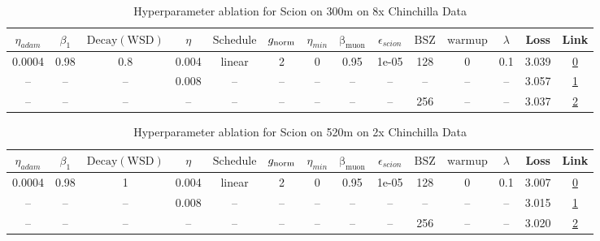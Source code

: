 \begin{table}[H]
\centering
\caption{Hyperparameter ablation for Scion on 300m on 8x Chinchilla Data}
\label{tab:ablation_scion_300m_on_8x_chinchilla_data}
\begin{tabular}{cccccccccccccc}
\toprule
$\eta_{adam}$ & $\beta_1$ & $\mathrm{Decay (WSD)}$ & $\eta$ & $\mathrm{Schedule}$ & $g_{\mathrm{norm}}$ & $\eta_{min}$ & $\mathrm{\beta_{muon}}$ & $\epsilon_{scion}$ & $\mathrm{BSZ}$ & $\mathrm{warmup}$ & $\lambda$ & Loss & Link \\
\midrule
0.0004 & 0.98 & 0.8 & 0.004 & linear & 2 & 0 & 0.95 & 1e-05 & 128 & 0 & 0.1 & 3.039 & \href{https://wandb.ai/marin-community/optimizer-scaling/runs/sweep-300m-48B-scion0ebd9blr0.004-wd0.1-minlr0-warmup0-b10.98-gn-c7b0e6}{0} \\
\midrule
-- & -- & -- & 0.008 & -- & -- & -- & -- & -- & -- & -- & -- & 3.057 & \href{https://wandb.ai/marin-community/optimizer-scaling/runs/sweep-300m-48B-scion60ecb7lr0.008-wd0.1-minlr0-warmup0-b10.98-gn-da458a}{1} \\
-- & -- & -- & -- & -- & -- & -- & -- & -- & 256 & -- & -- & 3.037 & \href{https://wandb.ai/marin-community/optimizer-scaling/runs/sweep-300m-48B-scione51587lr0.004-wd0.1-minlr0-warmup0-b10.98-gn-55b3ad}{2} \\
\bottomrule
\end{tabular}
\end{table}

\begin{table}[H]
\centering
\caption{Hyperparameter ablation for Scion on 520m on 2x Chinchilla Data}
\label{tab:ablation_scion_520m_on_2x_chinchilla_data}
\begin{tabular}{cccccccccccccc}
\toprule
$\eta_{adam}$ & $\beta_1$ & $\mathrm{Decay (WSD)}$ & $\eta$ & $\mathrm{Schedule}$ & $g_{\mathrm{norm}}$ & $\eta_{min}$ & $\mathrm{\beta_{muon}}$ & $\epsilon_{scion}$ & $\mathrm{BSZ}$ & $\mathrm{warmup}$ & $\lambda$ & Loss & Link \\
\midrule
0.0004 & 0.98 & 1 & 0.004 & linear & 2 & 0 & 0.95 & 1e-05 & 128 & 0 & 0.1 & 3.007 & \href{https://wandb.ai/marin-community/optimizer-scaling/runs/sweep-520m-21B-scioni268e92lr0.004-wd0.1-minlr0-warmup0-b10.98-g-a22c53}{0} \\
\midrule
-- & -- & -- & 0.008 & -- & -- & -- & -- & -- & -- & -- & -- & 3.015 & \href{https://wandb.ai/marin-community/optimizer-scaling/runs/sweep-520m-21B-scioni941d43lr0.008-wd0.1-minlr0-warmup0-b10.98-g-7f3250}{1} \\
-- & -- & -- & -- & -- & -- & -- & -- & -- & 256 & -- & -- & 3.020 & \href{https://wandb.ai/marin-community/optimizer-scaling/runs/sweep-520m-21B-scioni310e59lr0.004-wd0.1-minlr0-warmup0-b10.98-g-d42b8b}{2} \\
\bottomrule
\end{tabular}
\end{table}

